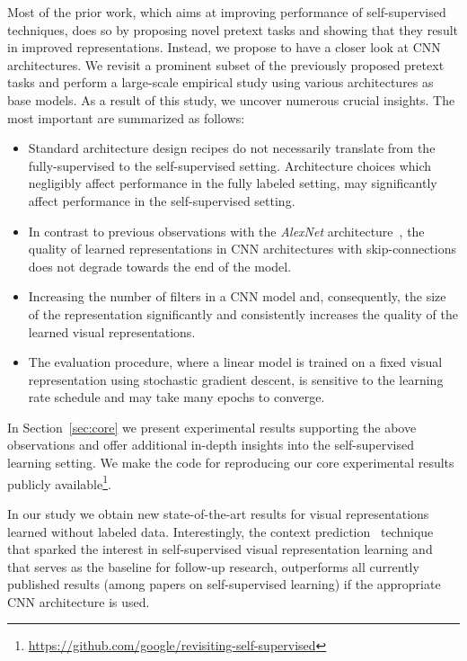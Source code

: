 \documentclass[10pt,twocolumn,letterpaper]{article}
\begin{document}
Most of the prior work, which aims at improving performance of self-supervised
techniques, does so by proposing novel pretext tasks and showing that they
result in improved representations.
Instead, we propose to have a closer look at CNN architectures.
We revisit a prominent subset of the previously proposed pretext tasks and perform a large-scale empirical study using various architectures as base models.
As a result of this study, we uncover numerous crucial insights.
The most important are summarized as follows:
\begin{itemize}
  \item Standard architecture design recipes do not necessarily translate from the fully-supervised to the self-supervised setting. Architecture choices which negligibly affect performance in the fully labeled setting, may significantly affect performance in the self-supervised setting.
\item In contrast to previous observations with the \emph{AlexNet} architecture~\cite{gidaris2018unsupervised,zhang2017split,noroozi2016unsupervised}, the quality of learned representations in CNN architectures with skip-connections does not degrade towards the end of the model. 
\item Increasing the number of filters in a CNN model and, consequently, the size of the representation significantly and consistently increases the quality of the learned visual representations.
\item The evaluation procedure, where a linear model is trained on a fixed visual representation using stochastic gradient descent, is sensitive to the learning rate schedule and may take many epochs to converge.
\end{itemize}
In Section~\ref{sec:core} we present experimental results supporting the above observations and offer additional in-depth insights into the self-supervised learning setting.
We make the code for reproducing our core experimental results publicly available\footnote{\scriptsize\url{https://github.com/google/revisiting-self-supervised}}.

In our study we obtain new state-of-the-art results for visual representations learned without labeled data.
Interestingly, the context prediction~\cite{doersch2015unsupervised} technique that sparked the interest in self-supervised visual representation learning and that serves as the baseline for follow-up research, outperforms all currently published results (among papers on self-supervised learning) if the appropriate CNN architecture is used.
\end{document}
